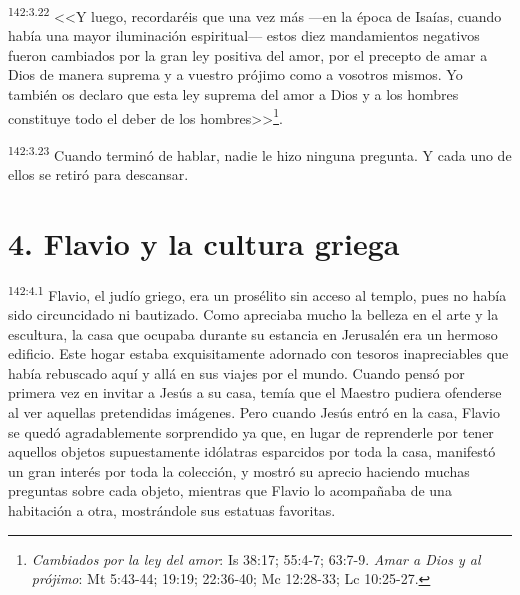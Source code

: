 \par 
\textsuperscript{142:3.22} <<Y luego, recordaréis que una vez más ---en la época de Isaías, cuando había una mayor iluminación espiritual--- estos diez mandamientos negativos fueron cambiados por la gran ley positiva del amor, por el precepto de amar a Dios de manera suprema y a vuestro prójimo como a vosotros mismos. Yo también os declaro que esta ley suprema del amor a Dios y a los hombres constituye todo el deber de los hombres>>\footnote{\textit{Cambiados por la ley del amor}: Is 38:17; 55:4-7; 63:7-9. \textit{Amar a Dios y al prójimo}: Mt 5:43-44; 19:19; 22:36-40; Mc 12:28-33; Lc 10:25-27.}.

\par 
\textsuperscript{142:3.23} Cuando terminó de hablar, nadie le hizo ninguna pregunta. Y cada uno de ellos se retiró para descansar.

\section*{4. Flavio y la cultura griega}
\par 
\textsuperscript{142:4.1} Flavio, el judío griego, era un prosélito sin acceso al templo, pues no había sido circuncidado ni bautizado. Como apreciaba mucho la belleza en el arte y la escultura, la casa que ocupaba durante su estancia en Jerusalén era un hermoso edificio. Este hogar estaba exquisitamente adornado con tesoros inapreciables que había rebuscado aquí y allá en sus viajes por el mundo. Cuando pensó por primera vez en invitar a Jesús a su casa, temía que el Maestro pudiera ofenderse al ver aquellas pretendidas imágenes. Pero cuando Jesús entró en la casa, Flavio se quedó agradablemente sorprendido ya que, en lugar de reprenderle por tener aquellos objetos supuestamente idólatras esparcidos por toda la casa, manifestó un gran interés por toda la colección, y mostró su aprecio haciendo muchas preguntas sobre cada objeto, mientras que Flavio lo acompañaba de una habitación a otra, mostrándole sus estatuas favoritas.

